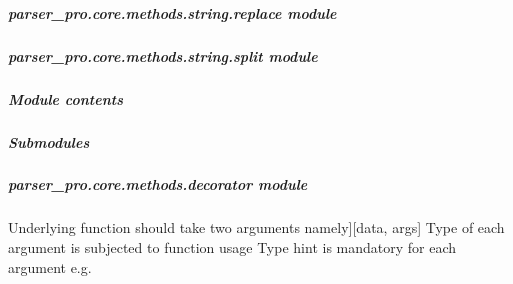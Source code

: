 \documentclass[letterpaper,10pt,english]{sphinxmanual}
\begin{document}
\subparagraph{parser\_pro.core.methods.string.replace module}
\label{\detokenize{parser_pro.core.methods.string:module-parser_pro.core.methods.string.replace}}\label{\detokenize{parser_pro.core.methods.string:parser-pro-core-methods-string-replace-module}}

\subparagraph{parser\_pro.core.methods.string.split module}
\label{\detokenize{parser_pro.core.methods.string:module-parser_pro.core.methods.string.split}}\label{\detokenize{parser_pro.core.methods.string:parser-pro-core-methods-string-split-module}}

\subparagraph{Module contents}
\label{\detokenize{parser_pro.core.methods.string:module-parser_pro.core.methods.string}}\label{\detokenize{parser_pro.core.methods.string:module-contents}}

\subparagraph{Submodules}
\label{\detokenize{parser_pro.core.methods:submodules}}

\subparagraph{parser\_pro.core.methods.decorator module}
\label{\detokenize{parser_pro.core.methods:module-parser_pro.core.methods.decorator}}\label{\detokenize{parser_pro.core.methods:parser-pro-core-methods-decorator-module}}

\begin{fulllineitems}
\label{\detokenize{parser_pro.core.methods:parser_pro.core.methods.decorator.method}}
\pysigstartsignatures
{}
\pysigstopsignatures\begin{description}
\sphinxlineitem{Hint}{[}Underlying function should take two arguments namely{]}{[}data, args{]}
\sphinxAtStartPar
Type of each argument is subjected to function usage
Type hint is mandatory for each argument e.g. 

\end{description}

\end{fulllineitems}
\end{document}
